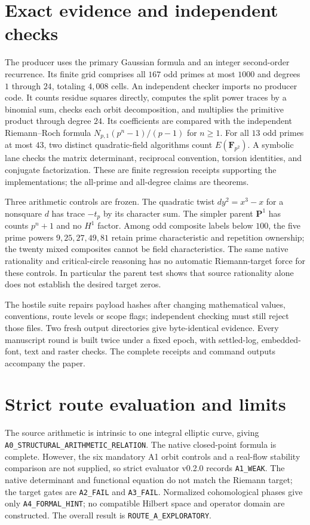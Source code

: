 \documentclass[10pt]{article}
\newcommand{\F}{\mathbf F}
\begin{document}
\section{Exact evidence and independent checks}
The producer uses the primary Gaussian formula and an integer
second-order recurrence. Its finite grid comprises all $167$ odd primes
at most $1000$ and degrees $1$ through $24$, totaling $4,008$ cells.
An independent checker imports no producer code. It counts residue
squares directly, computes the split power traces by a binomial sum,
checks each orbit decomposition, and multiplies the primitive product
through degree $24$. Its coefficients are compared with the independent
Riemann--Roch formula $N_{p,1}(p^n-1)/(p-1)$ for $n\geq1$.
For all $13$ odd primes at most $43$, two distinct quadratic-field
algorithms count $E(\F_{p^2})$. A symbolic lane checks the matrix
determinant, reciprocal convention, torsion identities, and conjugate
factorization. These are finite regression receipts supporting the
implementations; the all-prime and all-degree claims are theorems.

Three arithmetic controls are frozen. The quadratic twist
$dy^2=x^3-x$ for a nonsquare $d$ has trace $-t_p$ by its character sum.
The simpler parent $\mathbf P^1$ has counts $p^n+1$ and no $H^1$
factor. Among odd composite labels below $100$, the five prime powers
$9,25,27,49,81$ retain prime characteristic and repetition ownership;
the twenty mixed composites cannot be field characteristics. The same
native rationality and critical-circle reasoning has no automatic
Riemann-target force for these controls. In particular the parent test
shows that source rationality alone does not establish the desired
target zeros.

The hostile suite repairs payload hashes after changing mathematical
values, conventions, route levels or scope flags; independent checking
must still reject those files. Two fresh output directories give
byte-identical evidence. Every manuscript round is built twice under a
fixed epoch, with settled-log, embedded-font, text and raster checks.
The complete receipts and command outputs accompany the paper.

\section{Strict route evaluation and limits}
The source arithmetic is intrinsic to one integral elliptic curve,
giving \texttt{A0\_STRUCTURAL\_ARITHMETIC\_RELATION}. The native
closed-point formula is complete. However, the six mandatory A1 orbit
controls and a real-flow stability comparison are not supplied, so
strict evaluator v0.2.0 records \texttt{A1\_WEAK}. The native determinant
and functional equation do not match the Riemann target; the target
gates are \texttt{A2\_FAIL} and \texttt{A3\_FAIL}. Normalized
cohomological phases give only \texttt{A4\_FORMAL\_HINT}; no compatible
Hilbert space and operator domain are constructed. The overall result
is \texttt{ROUTE\_A\_EXPLORATORY}.
\end{document}
